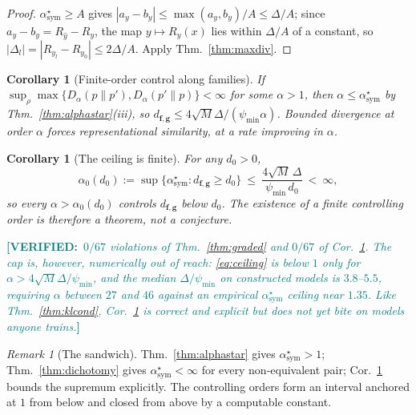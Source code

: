 \documentclass[10pt,letterpaper,twocolumn]{article}
\newcommand{\DONE}[1]{\textcolor{teal}{\small\textbf{[VERIFIED:}~\textit{#1}\textbf{]}}}
\newcommand{\bff}{\mathbf{f}}
\newcommand{\bfg}{\mathbf{g}}
\newcommand{\dfg}{d_{\bff,\bfg}}
\newcommand{\Dalpha}{D_{\alpha}}
\theoremstyle{plain}
\newtheorem{corollary}[theorem]{Corollary}
\theoremstyle{definition}
\theoremstyle{remark}
\newtheorem{remark}[theorem]{Remark}
\begin{document}
\begin{proof}
$\alpha^{\star}_{\mathrm{sym}}\ge A$ gives $|a_{y}-b_{y}|\le
\max(a_{y},b_{y})/A\le\Delta/A$; since $a_{y}-b_{y}=R_{\hat y}-R_{y}$, the map
$y\mapsto R_{y}(x)$ lies within $\Delta/A$ of a constant, so
$|\Delta_{l}|=|R_{y_{l}}-R_{y_{0}}|\le2\Delta/A$. Apply
Thm.~\ref{thm:maxdiv}.
\end{proof}

\begin{corollary}[Finite-order control along families]
\label{cor:finite}
If $\sup_{\rho}\max\{\Dalpha(p\|p'),\Dalpha(p'\|p)\}<\infty$ for some
$\alpha>1$, then $\alpha\le\alpha^{\star}_{\mathrm{sym}}$ by
Thm.~\ref{thm:alphastar}(iii), so
$\dfg\le4\sqrt{M}\Delta/(\psi_{\min}\alpha)$. Bounded divergence at order
$\alpha$ \emph{forces} representational similarity, at a rate improving in
$\alpha$.
\end{corollary}

\begin{corollary}[The ceiling is finite]
\label{cor:ceiling}
For any $d_{0}>0$,
\begin{equation}
\alpha_{0}(d_{0}):=\sup\{\alpha^{\star}_{\mathrm{sym}}:\dfg\ge d_{0}\}
\ \le\ \frac{4\sqrt{M}\,\Delta}{\psi_{\min}\,d_{0}}\ <\ \infty ,
\label{eq:ceiling}
\end{equation}
so every $\alpha>\alpha_{0}(d_{0})$ controls $\dfg$ below $d_{0}$. The
existence of a finite controlling order is therefore a theorem, not a
conjecture.
\end{corollary}

\DONE{$0/67$ violations of Thm.~\ref{thm:graded} and $0/67$ of
Cor.~\ref{cor:ceiling}. The cap is, however, numerically out of reach:
\eqref{eq:ceiling} is below $1$ only for
$\alpha>4\sqrt{M}\Delta/\psi_{\min}$, and the median $\Delta/\psi_{\min}$ on
constructed models is $3.8$--$5.5$, requiring $\alpha$ between $27$ and $46$
against an empirical $\alpha^{\star}_{\mathrm{sym}}$ ceiling near $1.35$. Like
Thm.~\ref{thm:klcond}, Cor.~\ref{cor:ceiling} is correct and explicit but does
not yet bite on models anyone trains.}

\begin{remark}[The sandwich]
\label{rem:sandwich}
Thm.~\ref{thm:alphastar} gives $\alpha^{\star}_{\mathrm{sym}}>1$;
Thm.~\ref{thm:dichotomy} gives $\alpha^{\star}_{\mathrm{sym}}<\infty$ for every
non-equivalent pair; Cor.~\ref{cor:ceiling} bounds the supremum explicitly. The
controlling orders form an interval anchored at $1$ from below and closed from
above by a computable constant.
\end{remark}
\end{document}
